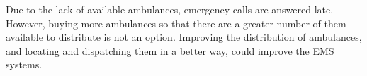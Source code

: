 Due to the lack of available ambulances, emergency calls are answered late. However, buying more ambulances so that there are a greater number of them available to distribute is not an option. Improving the distribution of ambulances, and locating and dispatching them in a better way, could improve the EMS systems.



